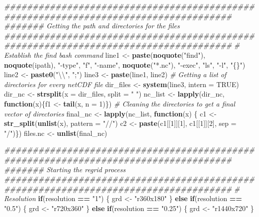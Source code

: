 \documentclass[]{book}
\newenvironment{Shaded}{\begin{snugshade}}{\end{snugshade}}
\newcommand{\CharTok}[1]{\textcolor[rgb]{0.31,0.60,0.02}{#1}}
\newcommand{\CommentTok}[1]{\textcolor[rgb]{0.56,0.35,0.01}{\textit{#1}}}
\newcommand{\ControlFlowTok}[1]{\textcolor[rgb]{0.13,0.29,0.53}{\textbf{#1}}}
\newcommand{\DataTypeTok}[1]{\textcolor[rgb]{0.13,0.29,0.53}{#1}}
\newcommand{\DecValTok}[1]{\textcolor[rgb]{0.00,0.00,0.81}{#1}}
\newcommand{\KeywordTok}[1]{\textcolor[rgb]{0.13,0.29,0.53}{\textbf{#1}}}
\newcommand{\NormalTok}[1]{#1}
\newcommand{\OperatorTok}[1]{\textcolor[rgb]{0.81,0.36,0.00}{\textbf{#1}}}
\newcommand{\OtherTok}[1]{\textcolor[rgb]{0.56,0.35,0.01}{#1}}
\newcommand{\StringTok}[1]{\textcolor[rgb]{0.31,0.60,0.02}{#1}}
\begin{document}
\begin{Shaded}
\begin{Highlighting}[]
{\CommentTok{####################################################################################}
\CommentTok{####### Getting the path and directories for the files}
\CommentTok{####################################################################################}
  \CommentTok{# Establish the find bash command}
\NormalTok{    line1 <-}\StringTok{ }\KeywordTok{paste}\NormalTok{(}\KeywordTok{noquote}\NormalTok{(}\StringTok{"find"}\NormalTok{), }\KeywordTok{noquote}\NormalTok{(ipath), }\StringTok{"-type"}\NormalTok{, }\StringTok{"f"}\NormalTok{, }\StringTok{"-name"}\NormalTok{, }
                   \KeywordTok{noquote}\NormalTok{(}\StringTok{"*.nc"}\NormalTok{), }\StringTok{"-exec"}\NormalTok{, }\StringTok{"ls"}\NormalTok{, }\StringTok{"-l"}\NormalTok{, }\StringTok{"\{\}"}\NormalTok{)}
\NormalTok{    line2 <-}\StringTok{ }\KeywordTok{paste0}\NormalTok{(}\StringTok{"}\CharTok{\textbackslash{}\textbackslash{}}\StringTok{"}\NormalTok{, }\StringTok{";"}\NormalTok{)}
\NormalTok{    line3 <-}\StringTok{ }\KeywordTok{paste}\NormalTok{(line1, line2)}
  \CommentTok{# Getting a list of directories for every netCDF file}
\NormalTok{    dir_files <-}\StringTok{ }\KeywordTok{system}\NormalTok{(line3, }\DataTypeTok{intern =} \OtherTok{TRUE}\NormalTok{)}
\NormalTok{    dir_nc <-}\StringTok{ }\KeywordTok{strsplit}\NormalTok{(}\DataTypeTok{x =}\NormalTok{ dir_files, }\DataTypeTok{split =} \StringTok{" "}\NormalTok{)}
\NormalTok{    nc_list <-}\StringTok{ }\KeywordTok{lapply}\NormalTok{(dir_nc, }\ControlFlowTok{function}\NormalTok{(x)\{f1 <-}\StringTok{ }\KeywordTok{tail}\NormalTok{(x, }\DataTypeTok{n =} \DecValTok{1}\NormalTok{)\})}
  \CommentTok{# Cleaning the directories to get a final vector of directories}
\NormalTok{    final_nc <-}\StringTok{ }\KeywordTok{lapply}\NormalTok{(nc_list, }\ControlFlowTok{function}\NormalTok{(x) \{}
\NormalTok{      c1 <-}\StringTok{ }\KeywordTok{str_split}\NormalTok{(}\KeywordTok{unlist}\NormalTok{(x), }\DataTypeTok{pattern =} \StringTok{"//"}\NormalTok{)}
\NormalTok{      c2 <-}\StringTok{ }\KeywordTok{paste}\NormalTok{(c1[[}\DecValTok{1}\NormalTok{]][}\DecValTok{1}\NormalTok{], c1[[}\DecValTok{1}\NormalTok{]][}\DecValTok{2}\NormalTok{], }\DataTypeTok{sep =} \StringTok{"/"}\NormalTok{)\})}
\NormalTok{    files.nc <-}\StringTok{ }\KeywordTok{unlist}\NormalTok{(final_nc)}
 
\CommentTok{####################################################################################}
\CommentTok{####### Starting the regrid process}
\CommentTok{#################################################################################### }
  \CommentTok{# Resolution}
    \ControlFlowTok{if}\NormalTok{(resolution }\OperatorTok{==}\StringTok{ "1"}\NormalTok{) \{}
\NormalTok{      grd <-}\StringTok{ "r360x180"}
\NormalTok{    \} }\ControlFlowTok{else} \ControlFlowTok{if}\NormalTok{(resolution }\OperatorTok{==}\StringTok{ "0.5"}\NormalTok{) \{}
\NormalTok{      grd <-}\StringTok{ "r720x360"}
\NormalTok{    \} }\ControlFlowTok{else} \ControlFlowTok{if}\NormalTok{(resolution }\OperatorTok{==}\StringTok{ "0.25"}\NormalTok{) \{}
\NormalTok{      grd <-}\StringTok{ "r1440x720"}
\NormalTok{    \}}
    
}
\end{Highlighting}
\end{Shaded}
\end{document}
